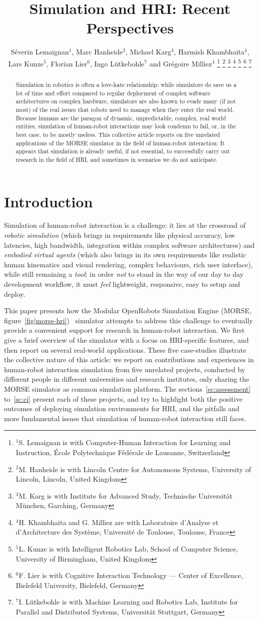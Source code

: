 \documentclass[letterpaper, 10pt, conference]{ieeeconf}
\title{Simulation and HRI: Recent Perspectives}
\author{
Séverin Lemaignan$^{1}$,
Marc Hanheide$^{2}$,
Michael Karg$^{3}$,
Harmish Khambhaita$^{4}$,\\
Lars Kunze$^{5}$,
Florian Lier$^{6}$,
Ingo Lütkebohle$^{7}$ and
Grégoire Milliez$^{4}$%
\thanks{$^{1}$S. Lemaignan is with Computer-Human Interaction for Learning and Instruction, École Polytechnique Fédérale de Lausanne, Switzerland}
\thanks{$^{2}$M. Hanheide is with Lincoln Centre for Autonomous Systems, University of Lincoln, Lincoln, United Kingdom}
\thanks{$^{3}$M. Karg is with Institute for Advanced Study, Technische Universität München, Garching, Germany}
\thanks{$^{4}$H. Khambhaita and G. Milliez are with Laboratoire d'Analyse et d'Architecture des Système, Université de Toulouse, Toulouse, France}
\thanks{$^{5}$L. Kunze is with Intelligent Robotics Lab, School of Computer Science, University of Birmingham, United Kingdom}
\thanks{$^{6}$F. Lier is with Cognitive Interaction Technology --- Center of Excellence, Bielefeld University, Bielefeld, Germany}
\thanks{$^{7}$I. Lütkebohle is with Machine Learning and Robotics Lab, Institute for Parallel and Distributed Systems, Universität Stuttgart, Germany}
}
\begin{document}
\maketitle
\thispagestyle{empty}
\pagestyle{empty}


\begin{abstract}

Simulation in robotics is often a love-hate relationship: while simulators do
save us a lot of time and effort compared to regular deployment of complex
software architectures on complex hardware, simulators are also known to evade
many (if not most) of the real issues that robots need to manage when they enter
the real world.  Because humans are the paragon of dynamic, unpredictable,
complex, real world entities, simulation of human-robot interactions may look
condemn to fail, or, in the best case, to be mostly useless.  This collective
article reports on five unrelated applications of the MORSE simulator in the
field of human-robot interaction: It appears that simulation is already useful,
if not essential, to successfully carry out research in the field of HRI, and
sometimes in scenarios we do not anticipate.

\end{abstract}

\section{Introduction}

Simulation of human-robot interaction is a challenge: it lies at the crossroad
of \emph{robotic simulation} (which brings in requirements like physical
accuracy, low latencies, high bandwidth, integration within complex software
architectures) and \emph{embodied virtual agents} (which also brings in its own
requirements like realistic human kinematics and visual rendering, complex
behaviours, rich user interface), while still remaining a \emph{tool}: in order
\emph{not} to stand in the way of our day to day development workflow, it must
\emph{feel} lightweight, responsive, easy to setup and deploy.

This paper presents how the Modular OpenRobots Simulation Engine (MORSE,
figure~\ref{fig|morse-hri})~\cite{morse_simpar_2012} simulator attempts to
address this challenge to eventually provide a convenient support for research
in human-robot interaction.  We first give a brief overview of the simulator
with a focus on HRI-specific features, and then report on several real-world
applications. These five case-studies illustrate the collective nature of this
article: we report on contributions and experiences in human-robot interaction
simulation from five unrelated projects, conducted by different people in
different universities and research institutes, only sharing the MORSE simulator
as common simulation platform. The sections~\ref{sc:assessment} to~\ref{sc:ci}
present each of these projects, and try to highlight both the positive
outcomes of deploying simulation environments for HRI, and the pitfalls and more
fundamental issues that simulation of human-robot interaction still faces.
\end{document}
